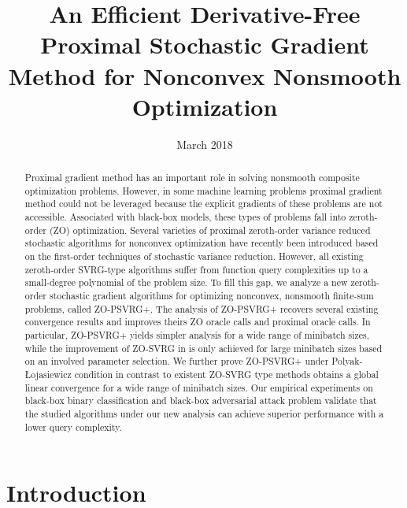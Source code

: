 \documentclass{article}
\title{An Efficient Derivative-Free Proximal Stochastic Gradient Method for Nonconvex Nonsmooth Optimization}
\date{March 2018}
\theoremstyle{definition}
\theoremstyle{remark}
\begin{document}
\maketitle
\begin{abstract}
Proximal gradient method has an important role
in solving nonsmooth composite optimization problems. However, in some machine learning problems  proximal gradient method could not be leveraged because the explicit gradients of these problems are not accessible. Associated with black-box models, these  types  of  problems fall  into  zeroth-order (ZO) optimization. Several varieties of proximal zeroth-order variance reduced stochastic algorithms  for nonconvex optimization have recently been introduced  based on the first-order techniques of stochastic variance reduction. 
However, all existing zeroth-order SVRG-type  algorithms suffer from function query complexities up  to a small-degree  polynomial  of  the  problem  size. To fill this gap, we analyze a new zeroth-order stochastic gradient algorithms for optimizing nonconvex, nonsmooth finite-sum problems, called ZO-PSVRG+. The analysis of ZO-PSVRG+ recovers several
existing convergence results and improves theirs ZO oracle calls and proximal oracle calls. In particular, ZO-PSVRG+ yields simpler analysis  for a wide range of minibatch sizes, while the improvement of ZO-SVRG in \cite{ji2019improved} is only achieved for large minibatch sizes based on an involved parameter selection. We further prove ZO-PSVRG+ under Polyak-Łojasiewicz condition in contrast to existent ZO-SVRG type methods obtains a global linear convergence for a wide range of minibatch sizes. Our empirical experiments on black-box binary classification and black-box adversarial attack problem
validate  that  the studied algorithms under our new analysis  can  achieve  superior performance with a lower  query complexity. 
\end{abstract}

\section{Introduction}
\end{document}
